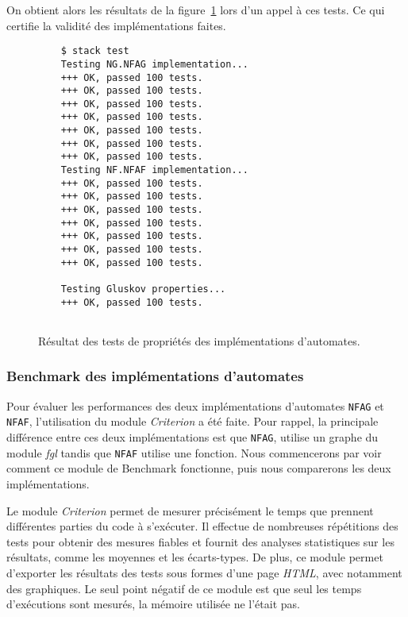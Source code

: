 \newpage

On obtient alors les résultats de la figure~\ref{fig:resTest} lors d'un appel
à ces tests. Ce qui certifie la validité des implémentations faites.

\begin{figure}[H]
    \begin{verbatim}
    $ stack test
    Testing NG.NFAG implementation...
    +++ OK, passed 100 tests.
    +++ OK, passed 100 tests.
    +++ OK, passed 100 tests.
    +++ OK, passed 100 tests.
    +++ OK, passed 100 tests.
    +++ OK, passed 100 tests.
    +++ OK, passed 100 tests.
    Testing NF.NFAF implementation...
    +++ OK, passed 100 tests.
    +++ OK, passed 100 tests.
    +++ OK, passed 100 tests.
    +++ OK, passed 100 tests.
    +++ OK, passed 100 tests.
    +++ OK, passed 100 tests.
    +++ OK, passed 100 tests.
    
    Testing Gluskov properties...
    +++ OK, passed 100 tests.
    
  \end{verbatim}
    \caption{Résultat des tests de propriétés des implémentations d'automates.}
    \label{fig:resTest}
\end{figure}

\subsubsection{Benchmark des implémentations d'automates}\label{section:bench}

Pour évaluer les performances des deux implémentations d'automates
\texttt{NFAG} et \texttt{NFAF}, l'utilisation du
module \textit{Criterion}\cite{criterion} a été faite. Pour rappel, la principale différence
entre ces deux implémentations est que \texttt{NFAG}, utilise un
graphe du module \textit{fgl} tandis que \texttt{NFAF} utilise une
fonction. Nous commencerons par voir comment ce module de Benchmark fonctionne,
puis nous comparerons les deux implémentations.

\vphantom{}

Le module \textit{Criterion} permet de mesurer précisément le temps que
prennent différentes parties du code à s'exécuter. Il effectue de
nombreuses répétitions des tests pour obtenir des mesures fiables et fournit des
analyses statistiques sur les résultats, comme les moyennes et les écarts-types.
De plus, ce module permet d'exporter les résultats des tests sous formes d'une
page \textit{HTML}, avec notamment des graphiques. Le seul point négatif de ce
module est que seul les temps d'exécutions sont mesurés, la mémoire utilisée ne
l'était pas.

